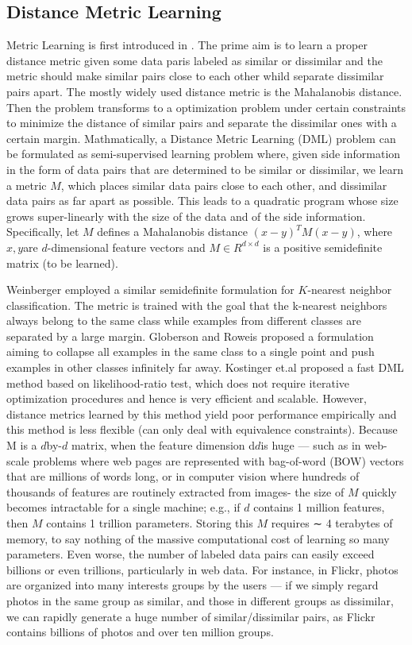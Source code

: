 \subsection{Distance Metric Learning}
Metric Learning is first introduced in \cite{Xing2002}. The prime aim is to learn a proper distance metric given some data paris labeled as similar or dissimilar and the metric should make similar pairs close to each other whild separate dissimilar pairs apart. The mostly widely used distance metric is the Mahalanobis distance. Then the problem transforms to a optimization problem under certain constraints to minimize the distance of similar pairs and separate the dissimilar ones with a certain margin. Mathmatically, a Distance Metric Learning (DML) problem can be formulated as semi-supervised learning problem where, given side information in the form of data pairs that are determined to be similar or dissimilar, we learn a metric $M$, which places similar data pairs close to each other, and dissimilar data pairs as far apart as possible. This leads to a quadratic program whose size grows super-linearly with the size of the data and of the side information. Specifically, let $M$ defines a Mahalanobis distance $(x−y)^TM(x−y)$, where $x, y$are $d$-dimensional feature vectors and $M\in R^{d\times d}$ is a positive semidefinite matrix (to be learned).

Weinberger \cite{Weinberger2005} employed a similar semidefinite formulation for $K$-nearest neighbor classification. The metric is trained with the goal that the k-nearest neighbors always belong to the same class while examples from different classes are separated by a large margin. Globerson and Roweis\cite{Globerson2005} proposed a formulation aiming to collapse all examples in the same class to a single point and push examples in other classes infinitely far away. Kostinger et.al \cite{Koestinger2012} proposed a fast DML method based on likelihood-ratio test, which does not require iterative optimization procedures and hence is very efficient and scalable. However, distance metrics learned by this method yield poor performance empirically and this method is less flexible (can only deal with equivalence constraints).
Because M is a $d$by-$d$ matrix, when the feature dimension d$d$is huge — such as in web-scale problems where web pages are represented with bag-of-word (BOW) vectors that are millions of words long, or in computer vision where hundreds of thousands of features are routinely extracted from images- the size of $M$ quickly becomes intractable for a single machine; e.g., if $d$ contains 1 million features, then $M$ contains 1 trillion parameters. Storing this $M$ requires ∼ 4 terabytes of memory, to say nothing of the massive computational cost of learning so many parameters. Even worse, the number of labeled data pairs can easily exceed billions or even trillions, particularly in web data. For instance, in Flickr, photos are organized into many interests groups by the users — if we simply regard photos in the same group as similar, and those in different groups as dissimilar, we can rapidly generate a huge number of similar/dissimilar pairs, as Flickr contains billions of photos and over ten million groups.



